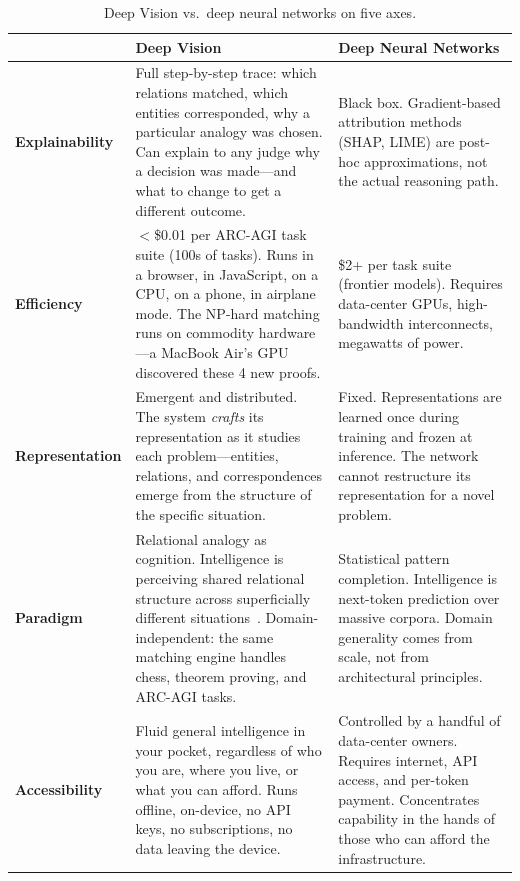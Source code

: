 \documentclass[11pt]{article}
\theoremstyle{definition}
\theoremstyle{remark}
\begin{document}
\begin{table}[h]
\centering
\small
\begin{tabular}{p{2.2cm}p{5.5cm}p{5.5cm}}
\toprule
& \textbf{Deep Vision} & \textbf{Deep Neural Networks} \\
\midrule
\textbf{Explain\-ability}
  & Full step-by-step trace: which relations matched, which entities corresponded, why a particular analogy was chosen.  Can explain to any judge why a decision was made---and what to change to get a different outcome.
  & Black box.  Gradient-based attribution methods (SHAP, LIME) are post-hoc approximations, not the actual reasoning path. \\[6pt]
\textbf{Efficiency}
  & $<$\$0.01 per ARC-AGI task suite (100s of tasks).  Runs in a browser, in JavaScript, on a CPU, on a phone, in airplane mode.  The NP-hard matching runs on commodity hardware---a MacBook Air's GPU discovered these 4 new proofs.
  & \$2+ per task suite (frontier models).  Requires data-center GPUs, high-bandwidth interconnects, megawatts of power. \\[6pt]
\textbf{Repre\-sentation}
  & Emergent and distributed.  The system \emph{crafts} its representation as it studies each problem---entities, relations, and correspondences emerge from the structure of the specific situation.
  & Fixed.  Representations are learned once during training and frozen at inference.  The network cannot restructure its representation for a novel problem. \\[6pt]
\textbf{Paradigm}
  & Relational analogy as cognition.  Intelligence is perceiving shared relational structure across superficially different situations~\cite{hofstadter_fluid_1995}.  Domain-independent: the same matching engine handles chess, theorem proving, and ARC-AGI tasks.
  & Statistical pattern completion.  Intelligence is next-token prediction over massive corpora.  Domain generality comes from scale, not from architectural principles. \\[6pt]
\textbf{Access\-ibility}
  & Fluid general intelligence in your pocket, regardless of who you are, where you live, or what you can afford.  Runs offline, on-device, no API keys, no subscriptions, no data leaving the device.
  & Controlled by a handful of data-center owners.  Requires internet, API access, and per-token payment.  Concentrates capability in the hands of those who can afford the infrastructure. \\
\bottomrule
\end{tabular}
\caption{Deep Vision vs.\ deep neural networks on five axes.}
\label{tab:dv-vs-dnn}
\end{table}
\end{document}
